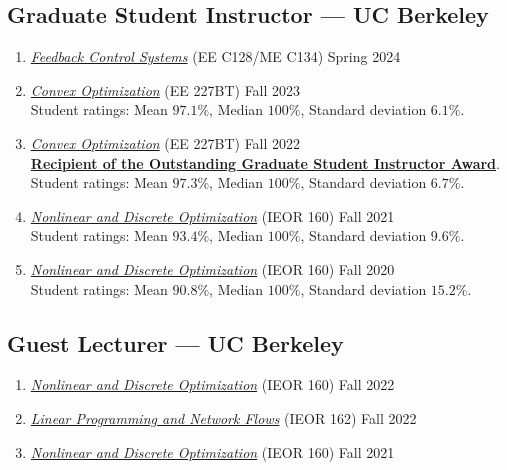 \documentclass[11pt]{article}
\newcommand{\subsectionskip}{\baselineskip}	%
\newcommand{\cvdate}[1]{\hfill#1}			%
\begin{document}
	\subsection{Graduate Student Instructor --- UC Berkeley}
	\begin{enumerate}[label={\arabic*.}]
		\item \href{https://classes.berkeley.edu/content/2024-spring-eleng-c128-001-lec-001}{\textit{Feedback Control Systems}} (EE C128/ME C134) \cvdate{Spring 2024}
		\item \href{https://classes.berkeley.edu/content/2023-fall-eleng-227bt-001-lec-001}{\textit{Convex Optimization}} (EE 227BT) \cvdate{Fall 2023} \\
		Student ratings: Mean $97.1\%$, Median $100\%$, Standard deviation $6.1\%$.
		\item \href{https://classes.berkeley.edu/content/2022-fall-eleng-227bt-001-lec-001}{\textit{Convex Optimization}} (EE 227BT) \cvdate{Fall 2022} \\
		\textbf{\href{https://gsi.berkeley.edu/programs-services/award-programs/ogsi/ogsi-recipients-2022-2023/}{Recipient of the Outstanding Graduate Student Instructor Award}}. \\
		Student ratings: Mean $97.3\%$, Median $100\%$, Standard deviation $6.7\%$.
		\item \href{https://lavaei.ieor.berkeley.edu/Course_IEOR160_Fall_2021.html}{\textit{Nonlinear and Discrete Optimization}} (IEOR 160) \cvdate{Fall 2021} \\
		Student ratings: Mean $93.4\%$, Median $100\%$, Standard deviation $9.6\%$.
		\item \href{https://lavaei.ieor.berkeley.edu/Course_IEOR160_Fall_2020.html}{\textit{Nonlinear and Discrete Optimization}} (IEOR 160) \cvdate{Fall 2020} \\
		Student ratings: Mean $90.8\%$, Median $100\%$, Standard deviation $15.2\%$.
	\end{enumerate}
	
	\vspace*{\subsectionskip}

	\subsection{Guest Lecturer --- UC Berkeley}

	\begin{enumerate}[label={\arabic*.}]
		\item \href{https://lavaei.ieor.berkeley.edu/Course_IEOR160_Fall_2022.html}{\textit{Nonlinear and Discrete Optimization}} (IEOR 160) \cvdate{Fall 2022}
		\item \href{https://lavaei.ieor.berkeley.edu/Course_IEOR162_Fall_2022.html}{\textit{Linear Programming and Network Flows}} (IEOR 162) \cvdate{Fall 2022}
		\item \href{https://lavaei.ieor.berkeley.edu/Course_IEOR160_Fall_2021.html}{\textit{Nonlinear and Discrete Optimization}} (IEOR 160) \cvdate{Fall 2021}
	\end{enumerate}
\end{document}
